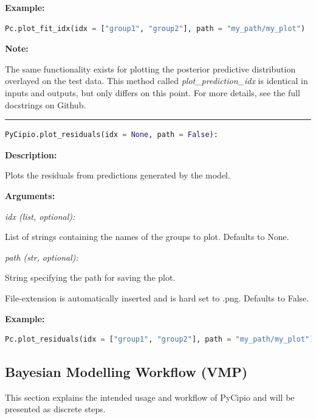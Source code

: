 \documentclass{article}
\begin{document}
\indent \textbf{Example:}

\begin{lstlisting}[language=Python]
        Pc.plot_fit_idx(idx = ["group1", "group2"], path = "my_path/my_plot")
\end{lstlisting}

\noindent \textbf{Note:}

\noindent The same functionality exists for plotting the posterior predictive distribution overlayed on the test data. This method called \textit{plot\_prediction\_idx} is identical in inputs and outputs, but only differs on this point. For more details, see the full docstrings on Github. 


\hrule

\begin{lstlisting}[language=Python]
    PyCipio.plot_residuals(idx = None, path = False):
\end{lstlisting}

\indent \textbf{Description:} 

\indent \indent Plots the residuals from predictions generated by the model.

\indent \textbf{Arguments:}

\indent \indent \textit{idx (list, optional):}

\indent \indent \indent List of strings containing the names of the groups to plot. Defaults to None.

\indent \indent \textit{path (str, optional):}

\indent \indent \indent String specifying the path for saving the plot. 

\indent \indent \indent File-extension is automatically inserted and is hard set to .png. Defaults to False.

\indent \textbf{Example:}

\begin{lstlisting}[language=Python]
        Pc.plot_residuals(idx = ["group1", "group2"], path = "my_path/my_plot")
\end{lstlisting}

\subsection{Bayesian Modelling Workflow (VMP)}

\noindent This section explains the intended usage and workflow of PyCipio and will be presented as discrete steps. 
\end{document}

